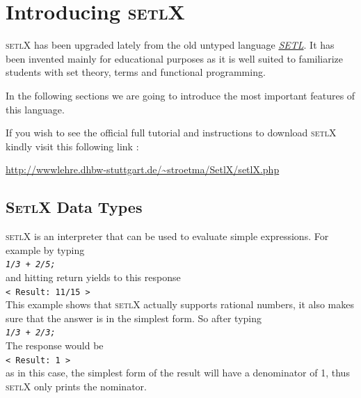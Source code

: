 \documentclass[11pt]{report}
\begin{document}
\chapter{Introducing \textsc{setlX}}

\textsc{setlX} has been upgraded lately from the old untyped language \href{http://en.wikipedia.org/wiki/SETL}{\emph{SETL}}. It has been invented mainly for educational purposes as it is well suited to familiarize students with set theory, terms and functional programming.

In the following sections we are going to introduce the most important features of this language.

\begin{center} If you wish to see the official full tutorial and instructions to download \textsc{setlX} kindly visit this following link : 

\url{http://wwwlehre.dhbw-stuttgart.de/~stroetma/SetlX/setlX.php} \end{center}

\section{\textsc{SetlX} Data Types}

\textsc{setlX} is an interpreter that can be used to evaluate simple expressions. For example by typing 
\\[0.2cm]
\hspace*{1.3cm}
\texttt{\textsl{1/3 + 2/5;}}
\\[0.2cm]
and hitting return yields to this response
\\[0.2cm]
\hspace*{1.3cm}
\texttt{< Result: 11/15 >}
\\[0.2cm]
This example shows that \textsc{setlX} actually supports rational numbers, it also makes sure that the answer is in the simplest form. So after typing
\\[0.2cm]
\hspace*{1.3cm}
\texttt{\textsl{1/3 + 2/3;}}
\\[0.2cm]
The response would be
\\[0.2cm]
\hspace*{1.3cm}
\texttt{< Result: 1 >}
\\[0.2cm]
as in this case, the simplest form of the result will have a denominator of 1, thus \textsc{setlX} only prints the nominator.
\end{document}
